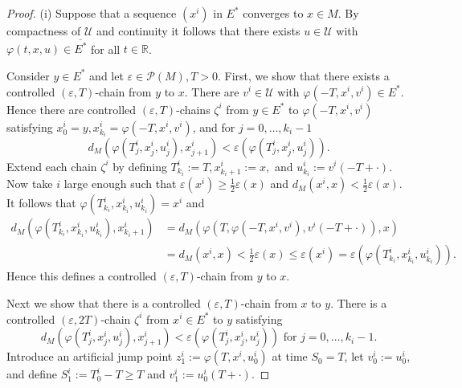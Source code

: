 \documentclass[preprint,12pt]{elsarticle}
\begin{document}
\begin{proof}
(i) Suppose that a sequence $\left(  x^{i}\right)  $ in $E^{\ast}$ converges
to $x\in M$. By compactness of $\mathcal{U}$ and continuity it follows that
there exists $u\in\mathcal{U}$ with $\varphi(t,x,u)\in\overline{E^{\ast}}$ for
all $t\in\mathbb{R}$.

Consider $y\in E^{\ast}$ and let $\varepsilon\in\mathcal{P}(M),T>0$. First, we
show that there exists a controlled $(\varepsilon,T)$-chain from $y$ to $x$.
There are $v^{i}\in\mathcal{U}$ with $\varphi(-T,x^{i},v^{i})\in E^{\ast}$.
Hence there are controlled $(\varepsilon,T)$-chains $\zeta^{i}$ from $y\in
E^{\ast}$ to $\varphi(-T,x^{i},v^{i})$ satisfying $x_{0}^{i}=y,x_{k_{i}}%
^{i}=\varphi(-T,x^{i},v^{i})$, and for $j=0,\ldots,k_{i}-1$%
\[
d_{M}(\varphi(T_{j}^{i},x_{j}^{i},u_{j}^{i}),x_{j+1}^{i})<\varepsilon
(\varphi(T_{j}^{i},x_{j}^{i},u_{j}^{i})).
\]
Extend each chain $\zeta^{i}$ by defining $T_{k_{i}}^{i}:=T,x_{k_{i}+1}%
^{i}:=x,$ and $u_{k_{i}}^{i}:=v^{i}(-T+\cdot)$. Now take $i$ large enough such
that $\varepsilon(x^{i})\geq\frac{1}{2}\varepsilon(x)$ and $d_{M}%
(x^{i},x)<\frac{1}{2}\varepsilon(x)$. It follows that $\varphi(T_{k_{i}}%
^{i},x_{k_{i}}^{i},u_{k_{i}}^{i})=x^{i}$ and%
\begin{align*}
d_{M}(\varphi(T_{k_{i}}^{i},x_{k_{i}}^{i},u_{k_{i}}^{i}),x_{k_{i}+1}^{i})  &
=d_{M}(\varphi(T,\varphi(-T,x^{i},v^{i}),v^{i}(-T+\cdot)),x)\\
&  =d_{M}(x^{i},x)<\frac{1}{2}\varepsilon(x)\leq\varepsilon(x^{i}%
)=\varepsilon(\varphi(T_{k_{i}}^{i},x_{k_{i}}^{i},u_{k_{i}}^{i})).
\end{align*}
Hence this defines a controlled $(\varepsilon,T)$-chain from $y$ to $x$.

Next we show that there is a controlled $(\varepsilon,T)$-chain from $x$ to
$y$. There is a controlled $(\varepsilon,2T)$-chain $\zeta^{i}$ from $x^{i}\in
E^{\ast}$ to $y$ satisfying%
\[
d_{M}(\varphi(T_{j}^{i},x_{j}^{i},u_{j}^{i}),x_{j+1}^{i})<\varepsilon
(\varphi(T_{j}^{i},x_{j}^{i},u_{j}^{i}))\text{ for }j=0,\ldots,k_{i}-1.
\]
Introduce an artificial jump point $z_{1}^{i}:=\varphi(T,x^{i},u_{0}^{i})$ at
time $S_{0}=T$, let $v_{0}^{i}:=u_{0}^{i}$, and define $S_{1}^{i}:=T_{0}%
^{i}-T\geq T$ and $v_{1}^{i}:=u_{0}^{i}(T+\cdot)$.


\end{proof}
\end{document}
